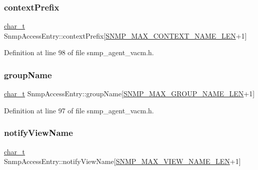 \subsubsection{\texorpdfstring{context\+Prefix}{contextPrefix}}
{\footnotesize\ttfamily \hyperlink{compiler__port_8h_a40bb5262bf908c328fbcfbe5d29d0201}{char\+\_\+t} Snmp\+Access\+Entry\+::context\+Prefix\mbox{[}\hyperlink{snmp__common_8h_a59ce7ec8feba50f15272257094e14ac8}{S\+N\+M\+P\+\_\+\+M\+A\+X\+\_\+\+C\+O\+N\+T\+E\+X\+T\+\_\+\+N\+A\+M\+E\+\_\+\+L\+EN}+1\mbox{]}}



Definition at line 98 of file snmp\+\_\+agent\+\_\+vacm.\+h.

\mbox{\label{structSnmpAccessEntry_a00aa9f193a226e0d2b3753225fbab667}} 
\subsubsection{\texorpdfstring{group\+Name}{groupName}}
{\footnotesize\ttfamily \hyperlink{compiler__port_8h_a40bb5262bf908c328fbcfbe5d29d0201}{char\+\_\+t} Snmp\+Access\+Entry\+::group\+Name\mbox{[}\hyperlink{snmp__common_8h_a0810d82091ca56abdd23f86a04944c32}{S\+N\+M\+P\+\_\+\+M\+A\+X\+\_\+\+G\+R\+O\+U\+P\+\_\+\+N\+A\+M\+E\+\_\+\+L\+EN}+1\mbox{]}}



Definition at line 97 of file snmp\+\_\+agent\+\_\+vacm.\+h.

\mbox{\label{structSnmpAccessEntry_a55d2f13d5f46593a17b29a88293b29e2}} 
\subsubsection{\texorpdfstring{notify\+View\+Name}{notifyViewName}}
{\footnotesize\ttfamily \hyperlink{compiler__port_8h_a40bb5262bf908c328fbcfbe5d29d0201}{char\+\_\+t} Snmp\+Access\+Entry\+::notify\+View\+Name\mbox{[}\hyperlink{snmp__common_8h_a8188d8ada88e9fc2c0a6d2010105b14c}{S\+N\+M\+P\+\_\+\+M\+A\+X\+\_\+\+V\+I\+E\+W\+\_\+\+N\+A\+M\+E\+\_\+\+L\+EN}+1\mbox{]}}



